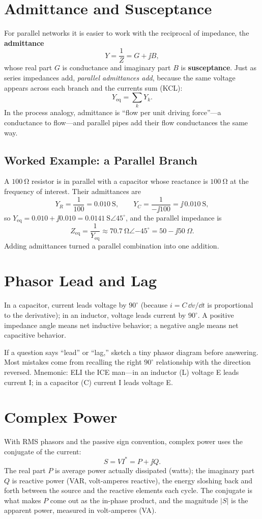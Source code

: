 \section{Admittance and Susceptance}
For parallel networks it is easier to work with the reciprocal of impedance, the
\textbf{admittance}
\[
Y=\frac{1}{Z}=G+\jj B,
\]
whose real part \(G\) is conductance and imaginary part \(B\) is
\textbf{susceptance}. Just as series impedances add, \emph{parallel admittances
add}, because the same voltage appears across each branch and the currents sum
(KCL):
\[
Y_{\mathrm{eq}}=\sum_k Y_k.
\]
In the process analogy, admittance is ``flow per unit driving force''---a
conductance to flow---and parallel pipes add their flow conductances the same way.

\subsection{Worked Example: a Parallel Branch}
A \(\SI{100}{\ohm}\) resistor is in parallel with a capacitor whose reactance is
\(\SI{100}{\ohm}\) at the frequency of interest. Their admittances are
\[
Y_R=\frac{1}{100}=\SI{0.010}{\siemens},
\qquad
Y_C=\frac{1}{-\jj100}=\jj\,\SI{0.010}{\siemens},
\]
so \(Y_{\mathrm{eq}}=0.010+\jj0.010=\SI{0.0141}{\siemens}\angle45^\circ\), and the
parallel impedance is
\[
Z_{\mathrm{eq}}=\frac{1}{Y_{\mathrm{eq}}}\approx\SI{70.7}{\ohm}\angle{-45^\circ}
=50-\jj50\ \Omega.
\]
Adding admittances turned a parallel combination into one addition.

\section{Phasor Lead and Lag}
In a capacitor, current leads voltage by \(90^\circ\) (because
\(i=C\,\dd v/\dd t\) is proportional to the derivative); in an inductor, voltage
leads current by \(90^\circ\). A positive impedance angle means net inductive
behavior; a negative angle means net capacitive behavior.

\begin{exambox}
If a question says ``lead'' or ``lag,'' sketch a tiny phasor diagram before
answering. Most mistakes come from recalling the right \(90^\circ\) relationship
with the direction reversed. Mnemonic: ELI the ICE man---in an inductor (L)
voltage E leads current I; in a capacitor (C) current I leads voltage E.
\end{exambox}

\section{Complex Power}
With RMS phasors and the passive sign convention, complex power uses the
conjugate of the current:
\[
S=V I^{*}=P+\jj Q .
\]
The real part \(P\) is average power actually dissipated (watts); the imaginary
part \(Q\) is reactive power (VAR, volt-amperes reactive), the energy sloshing
back and forth between the source and the reactive elements each cycle. The
conjugate is what makes \(P\) come out as the in-phase product, and the magnitude
\(|S|\) is the apparent power, measured in volt-amperes (VA).

